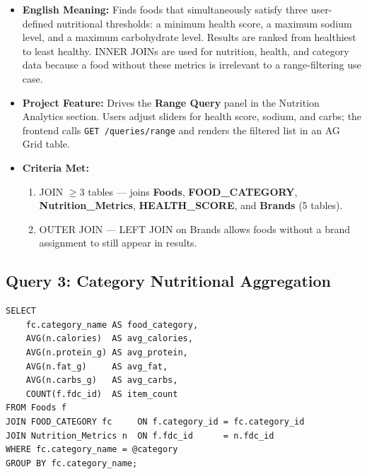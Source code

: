 \documentclass[12pt,a4paper]{article}
\begin{document}
\begin{metabox}
\begin{itemize}
  \item \textbf{English Meaning:} Finds foods that simultaneously satisfy three user-defined
    nutritional thresholds: a minimum health score, a maximum sodium level, and a maximum
    carbohydrate level. Results are ranked from healthiest to least healthy. INNER JOINs are
    used for nutrition, health, and category data because a food without these metrics is
    irrelevant to a range-filtering use case.
  \item \textbf{Project Feature:} Drives the \textbf{Range Query} panel in the Nutrition
    Analytics section. Users adjust sliders for health score, sodium, and carbs; the frontend
    calls \texttt{GET /queries/range} and renders the filtered list in an AG Grid table.
  \item \textbf{Criteria Met:}
    \begin{enumerate}[label=\textbf{\arabic*}]
      \item JOIN $\geq$3 tables --- joins \textbf{Foods}, \textbf{FOOD\_CATEGORY},
        \textbf{Nutrition\_Metrics}, \textbf{HEALTH\_SCORE}, and \textbf{Brands}
        (5 tables).
      \item OUTER JOIN --- LEFT JOIN on Brands allows foods without a brand assignment
        to still appear in results.
    \end{enumerate}
\end{itemize}
\end{metabox}

\subsection{Query 3: Category Nutritional Aggregation}

\begin{sqlbox}
\small
\begin{verbatim}
SELECT
    fc.category_name AS food_category,
    AVG(n.calories)  AS avg_calories,
    AVG(n.protein_g) AS avg_protein,
    AVG(n.fat_g)     AS avg_fat,
    AVG(n.carbs_g)   AS avg_carbs,
    COUNT(f.fdc_id)  AS item_count
FROM Foods f
JOIN FOOD_CATEGORY fc     ON f.category_id = fc.category_id
JOIN Nutrition_Metrics n  ON f.fdc_id      = n.fdc_id
WHERE fc.category_name = @category
GROUP BY fc.category_name;
\end{verbatim}
\end{sqlbox}
\end{document}
